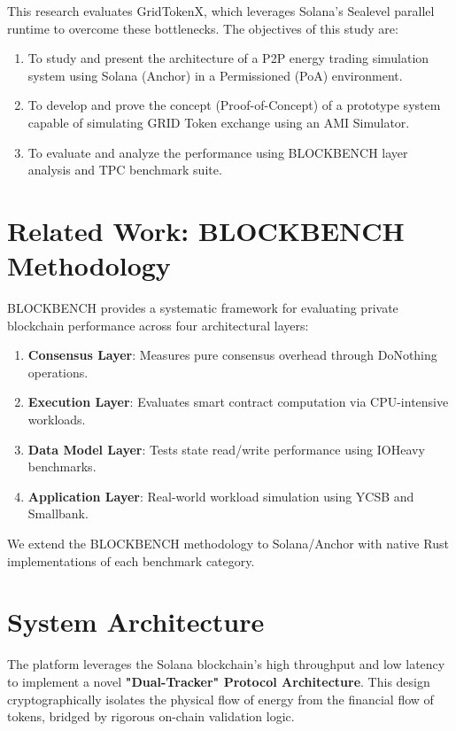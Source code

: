 \documentclass[conference]{IEEEtran}
\begin{document}
This research evaluates GridTokenX, which leverages Solana's Sealevel parallel runtime \cite{b3} to overcome these bottlenecks. The objectives of this study are:
\begin{enumerate}
    \item To study and present the architecture of a P2P energy trading simulation system using Solana (Anchor) in a Permissioned (PoA) environment.
    \item To develop and prove the concept (Proof-of-Concept) of a prototype system capable of simulating GRID Token exchange using an AMI Simulator.
    \item To evaluate and analyze the performance using BLOCKBENCH layer analysis and TPC benchmark suite.
\end{enumerate}

\section{Related Work: BLOCKBENCH Methodology}
BLOCKBENCH \cite{b4} provides a systematic framework for evaluating private blockchain performance across four architectural layers:

\begin{enumerate}
    \item \textbf{Consensus Layer}: Measures pure consensus overhead through DoNothing operations.
    \item \textbf{Execution Layer}: Evaluates smart contract computation via CPU-intensive workloads.
    \item \textbf{Data Model Layer}: Tests state read/write performance using IOHeavy benchmarks.
    \item \textbf{Application Layer}: Real-world workload simulation using YCSB and Smallbank.
\end{enumerate}

We extend the BLOCKBENCH methodology to Solana/Anchor with native Rust implementations of each benchmark category.

\section{System Architecture}
The platform leverages the Solana blockchain's high throughput and low latency to implement a novel \textbf{"Dual-Tracker" Protocol Architecture}. This design cryptographically isolates the physical flow of energy from the financial flow of tokens, bridged by rigorous on-chain validation logic.
\end{document}
